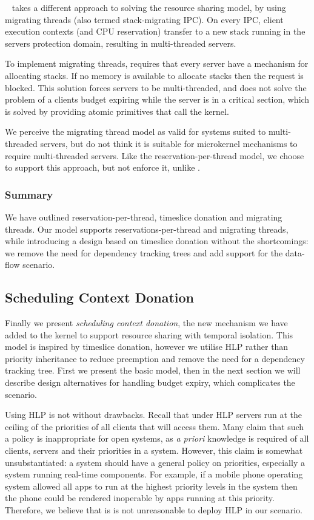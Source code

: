 \composite~\citep{Parmer_10} takes a different approach to solving the resource sharing model, by using migrating threads (also termed stack-migrating IPC).
On every IPC, client execution contexts (and CPU reservation) transfer to a new stack running in the servers protection domain, resulting in multi-threaded servers.

To implement migrating threads, \composite requires that every server have a mechanism for allocating stacks.
If no memory is available to allocate stacks then the request is blocked.
This solution forces servers to be multi-threaded, and does not solve the problem of a clients budget expiring while the server is in a critical section, which is solved by providing atomic primitives that call the kernel.

We perceive the migrating thread model as valid for systems suited to multi-threaded servers, but do not think it is suitable for microkernel mechanisms to require multi-threaded servers.
Like the reservation-per-thread model, we choose to support this approach, but not enforce it, unlike \composite.

\subsubsection{Summary}

We have outlined reservation-per-thread, timeslice donation and migrating threads.
Our model supports reservations-per-thread and migrating threads, while introducing a design based on timeslice donation without the shortcomings: we remove the need for dependency tracking trees and add support for the data-flow scenario.

\subsection{Scheduling Context Donation}

Finally we present \emph{scheduling context donation}, the new mechanism we have added to the kernel to support resource sharing with temporal isolation.
This model is inspired by timeslice donation, however we utilise \gls{HLP} rather than priority inheritance to reduce preemption and remove the need for a dependency tracking tree.
First we present the basic model, then in the next section we will describe design alternatives for handling budget expiry, which complicates the scenario.

Using \gls{HLP} is not without drawbacks.
Recall that under \gls{HLP} servers run at the ceiling of the priorities of all clients that will access them.
Many claim that such a policy is inappropriate for open systems, as \emph{a priori} knowledge is required of all clients, servers and their priorities in a system.
However, this claim is somewhat unsubstantiated: a system should have a general policy on priorities, especially a system running real-time components.
For example, if a mobile phone operating system allowed all apps to run at the highest priority levels in the system then the phone could be rendered inoperable by apps running at this priority.
Therefore, we believe that is is not unreasonable to deploy \gls{HLP} in our scenario.

